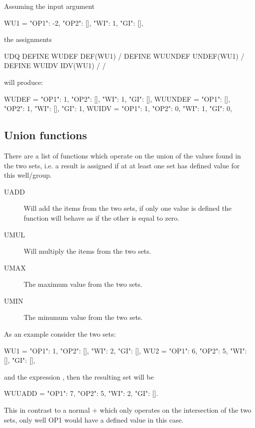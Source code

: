 Assuming the input argument

\begin{code}
  WU1 = {"OP1": -2, "OP2": [], "WI": 1, "GI": []},
\end{code}

the \udq{} assignments

\begin{deck}
UDQ
  DEFINE WUDEF   DEF(WU1) /
  DEFINE WUUNDEF UNDEF(WU1) /
  DEFINE WUIDV   IDV(WU1) /
/
\end{deck}

will produce:

\begin{code}
  WUDEF   = {"OP1": 1,  "OP2": [], "WI": 1,  "GI": []},
  WUUNDEF = {"OP1": [], "OP2": 1,  "WI": [], "GI": 1},
  WUIDV   = {"OP1": 1,  "OP2": 0,  "WI": 1,  "GI": 0},
\end{code}



\subsection{Union functions}
\label{udq_union_functions}
There are a list of functions  which operate on the union of the values
found in the two sets, i.e. a result is assigned if at at least one set has
defined value for this well/group.
\begin{description}
\item[UADD] Will add the items from the two sets, if only one value is defined
  the function will behave as if the other is equal to zero.
\item[UMUL] Will multiply the items from the two sets.
\item[UMAX] The maximum value from the two sets.
\item[UMIN] The minumum value from the two sets.
\end{description}

As an example consider the two sets:
\begin{code}
  WU1     = {"OP1": 1, "OP2": [], "WI": 2,  "GI": []},
  WU2     = {"OP1": 6, "OP2": 5,  "WI": [], "GI": []},
\end{code}

and the \udq{} expression , then the resulting
set  will be
\begin{code}
  WUUADD  = {"OP1": 7, "OP2": 5,  "WI": 2,  "GI": []}.
\end{code}
This in contrast to a normal $+$ which only operates on the intersection of the
two sets, only well OP1 would have a defined value in this case.


